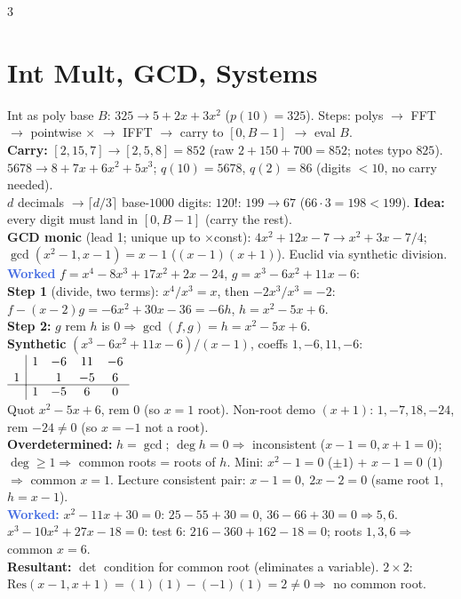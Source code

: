 \documentclass[9pt]{extarticle}
\newcommand{\hl}[1]{\textbf{\textcolor{BrickRed}{#1}}}
\newcommand{\wk}[1]{\textbf{\textcolor{OliveGreen}{#1}}}
\newcommand{\ex}[1]{\textbf{\textcolor{RoyalBlue}{#1}}}
\begin{document}
\begin{multicols}{3}
\section{Int Mult, GCD, Systems}
\begin{sloppypar}\raggedright
Int as poly base $B$: $325\to5{+}2x{+}3x^2$ ($p(10){=}325$). Steps: polys $\to$ FFT $\to$ pointwise ${\times}$ $\to$ IFFT $\to$ carry to $[0,B{-}1]$ $\to$ eval $B$.\\
\hl{Carry:} $[2,15,7]\to[2,5,8]{=}852$ (raw $2{+}150{+}700{=}852$; notes typo $825$). $5678\to8{+}7x{+}6x^2{+}5x^3$; $q(10){=}5678$, $q(2){=}86$ (digits $<10$, no carry needed).\\
$d$ decimals $\to\lceil d/3\rceil$ base-$1000$ digits: $120!$: $199\to67$ ($66{\cdot}3{=}198{<}199$). \hl{Idea:} every digit must land in $[0,B{-}1]$ (carry the rest).\\
\hl{GCD monic} (lead 1; unique up to ${\times}$const): $4x^2{+}12x{-}7\to x^2{+}3x{-}7/4$; $\gcd(x^2{-}1,x{-}1){=}x{-}1$ ($(x{-}1)(x{+}1)$). Euclid via synthetic division.\\
\ex{Worked} $f{=}x^4{-}8x^3{+}17x^2{+}2x{-}24$, $g{=}x^3{-}6x^2{+}11x{-}6$:\\
\wk{Step 1} (divide, two terms): $x^4/x^3{=}x$, then ${-}2x^3/x^3{=}{-}2$: $f{-}(x{-}2)g{=}{-}6x^2{+}30x{-}36{=}{-}6h$, $h{=}x^2{-}5x{+}6$.\\
\wk{Step 2:} $g$ rem $h$ is $0\Rightarrow\gcd(f,g){=}h{=}x^2{-}5x{+}6$.\\
\wk{Synthetic} $(x^3{-}6x^2{+}11x{-}6)/(x{-}1)$, coeffs $1,{-}6,11,{-}6$:
$\begin{array}{c|cccc} & 1 & {-}6 & 11 & {-}6\\[1pt] 1 & & 1 & {-}5 & 6\\[-1pt] \hline & 1 & {-}5 & 6 & 0 \end{array}$\\
Quot $x^2{-}5x{+}6$, rem $0$ (so $x{=}1$ root). Non-root demo $(x{+}1)$: $1,{-}7,18,{-}24$, rem ${-}24{\ne}0$ (so $x{=}{-}1$ not a root).\\
\hl{Overdetermined:} $h{=}\gcd$; $\deg h{=}0\Rightarrow$ inconsistent ($x{-}1{=}0,x{+}1{=}0$); $\deg{\ge}1\Rightarrow$ common roots = roots of $h$. Mini: $x^2{-}1{=}0$ (${\pm}1$) + $x{-}1{=}0$ ($1$) $\Rightarrow$ common $x{=}1$. Lecture consistent pair: $x{-}1{=}0,\ 2x{-}2{=}0$ (same root $1$, $h{=}x{-}1$).\\
\ex{Worked:} $x^2{-}11x{+}30{=}0$: $25{-}55{+}30{=}0$, $36{-}66{+}30{=}0\Rightarrow5,6$.\\
$x^3{-}10x^2{+}27x{-}18{=}0$: test $6$: $216{-}360{+}162{-}18{=}0$; roots $1,3,6\Rightarrow$ common \hl{$x{=}6$}.\\
\hl{Resultant:} $\det$ condition for common root (eliminates a variable). $2{\times}2$: $\mathrm{Res}(x{-}1,x{+}1){=}(1)(1){-}({-}1)(1){=}2{\ne}0\Rightarrow$ no common root.
\end{sloppypar}


\end{multicols}
\end{document}
